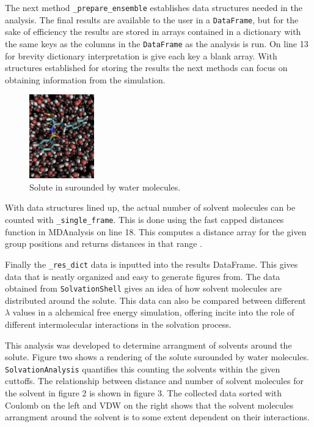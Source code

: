 \documentclass{article}[letterpaper, margins=1in, 12pt]
\begin{document}
The next method \lstinline{_prepare_ensemble} establishes data structures needed in the analysis. The final results are available to the user in a \texttt{DataFrame}, but for the sake of efficiency the results are stored in arrays contained in a dictionary with the same keys as the columns in the \texttt{DataFrame} as the analysis is run. On line 13 for brevity dictionary interpretation is give each key a blank array.  With structures established for storing the results the next methods can focus on obtaining information from the simulation.

\begin{figure}
	\centering
	\includegraphics[width=0.25\textwidth]{solvent}
	\caption{Solute in surounded by water molecules.}
	\label{fig:solute}
\end{figure}

With data structures lined up, the actual number of solvent molecules can be counted with \lstinline{_single_frame}. This is done using the fast capped distances function in MDAnalysis on line 18. This computes a distance array for the given group positions and returns distances in that range \cite{michaud-agrawal_mdanalysis_2011, gowers_mdanalysis_2016}.

Finally the \lstinline{_res_dict} data is inputted into the results DataFrame. This gives data that is neatly organized and easy to generate figures from. The data obtained from \texttt{SolvationShell} gives an idea of how solvent molecules are distributed around the solute. This data can also be compared between different $\lambda$ values in a alchemical free energy simulation, offering incite into the role of different intermolecular interactions in the solvation process.

This analysis was developed to determine arrangment of solvents around the solute. Figure two shows a rendering of the solute surounded by water molecules. \texttt{SolvationAnalysis} quantifies this counting the solvents within the given cuttoffs. The relationship between distance and number of solvent molecules for the solvent in figure 2 is shown in figure 3. The collected data sorted with Coulomb on the left and VDW on the right shows that the solvent molecules arrangment around the solvent is to some extent dependent on their interactions.
\end{document}
